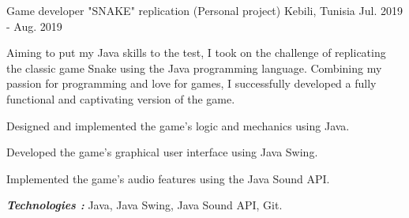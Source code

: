 \begin{cventries}
  \cventry
    {Game developer} %
    {"SNAKE" replication (Personal project)} %
    {Kebili, Tunisia} %
    {Jul. 2019 - Aug. 2019} %
    {
      Aiming to put my Java skills to the test, I took on the challenge of replicating the classic game Snake using the Java programming language. Combining my passion for programming and love for games, I successfully developed a fully functional and captivating version of the game.
      \vspace{5mm}
      \begin{cvitems} %
        \item {Designed and implemented the game's logic and mechanics using Java.}
        \item {Developed the game's graphical user interface using Java Swing.}
        \item {Implemented the game's audio features using the Java Sound API.}
       \end{cvitems}
       \vspace{5mm}
      \textbf{\textit{Technologies :}} Java, Java Swing, Java Sound API, Git.
      \vspace{5mm}
    }


\end{cventries}
